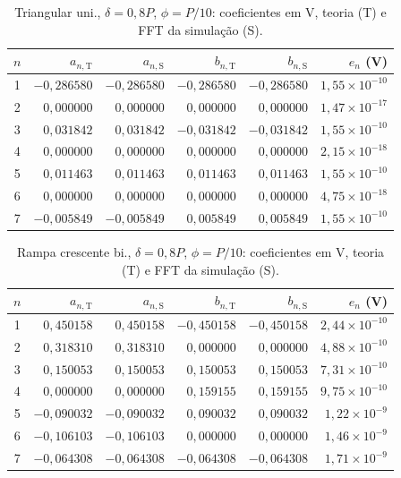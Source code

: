 \begin{table}[H]
\centering
\footnotesize\setlength{\tabcolsep}{2pt}
\caption{Triangular uni., $\delta=0{,}8P$, $\phi=P/10$: coeficientes em V, teoria (T) e FFT da simulação (S).}\label{tab:coef_comp15}
\begin{tabular}{crrrrr}\hline
$n$ & $a_{n,\mathrm T}$ & $a_{n,\mathrm S}$ & $b_{n,\mathrm T}$ & $b_{n,\mathrm S}$ & $e_n$ (V) \\ \hline
1 & $-0{,}286580$ & $-0{,}286580$ & $-0{,}286580$ & $-0{,}286580$ & $1{,}55\!\times\!10^{-10}$ \\
2 & $0{,}000000$ & $0{,}000000$ & $0{,}000000$ & $0{,}000000$ & $1{,}47\!\times\!10^{-17}$ \\
3 & $0{,}031842$ & $0{,}031842$ & $-0{,}031842$ & $-0{,}031842$ & $1{,}55\!\times\!10^{-10}$ \\
4 & $0{,}000000$ & $0{,}000000$ & $0{,}000000$ & $0{,}000000$ & $2{,}15\!\times\!10^{-18}$ \\
5 & $0{,}011463$ & $0{,}011463$ & $0{,}011463$ & $0{,}011463$ & $1{,}55\!\times\!10^{-10}$ \\
6 & $0{,}000000$ & $0{,}000000$ & $0{,}000000$ & $0{,}000000$ & $4{,}75\!\times\!10^{-18}$ \\
7 & $-0{,}005849$ & $-0{,}005849$ & $0{,}005849$ & $0{,}005849$ & $1{,}55\!\times\!10^{-10}$ \\
\hline\end{tabular}
\end{table}
\begin{table}[H]
\centering
\footnotesize\setlength{\tabcolsep}{2pt}
\caption{Rampa crescente bi., $\delta=0{,}8P$, $\phi=P/10$: coeficientes em V, teoria (T) e FFT da simulação (S).}\label{tab:coef_comp16}
\begin{tabular}{crrrrr}\hline
$n$ & $a_{n,\mathrm T}$ & $a_{n,\mathrm S}$ & $b_{n,\mathrm T}$ & $b_{n,\mathrm S}$ & $e_n$ (V) \\ \hline
1 & $0{,}450158$ & $0{,}450158$ & $-0{,}450158$ & $-0{,}450158$ & $2{,}44\!\times\!10^{-10}$ \\
2 & $0{,}318310$ & $0{,}318310$ & $0{,}000000$ & $0{,}000000$ & $4{,}88\!\times\!10^{-10}$ \\
3 & $0{,}150053$ & $0{,}150053$ & $0{,}150053$ & $0{,}150053$ & $7{,}31\!\times\!10^{-10}$ \\
4 & $0{,}000000$ & $0{,}000000$ & $0{,}159155$ & $0{,}159155$ & $9{,}75\!\times\!10^{-10}$ \\
5 & $-0{,}090032$ & $-0{,}090032$ & $0{,}090032$ & $0{,}090032$ & $1{,}22\!\times\!10^{-9}$ \\
6 & $-0{,}106103$ & $-0{,}106103$ & $0{,}000000$ & $0{,}000000$ & $1{,}46\!\times\!10^{-9}$ \\
7 & $-0{,}064308$ & $-0{,}064308$ & $-0{,}064308$ & $-0{,}064308$ & $1{,}71\!\times\!10^{-9}$ \\
\hline\end{tabular}
\end{table}
